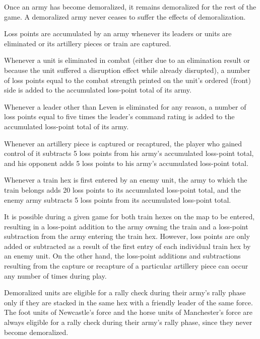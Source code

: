  Once an army has become demoralized, it remains demoralized for the rest of the game. A demoralized army never ceases to suffer the effects of demoralization.

 Loss points are accumulated by an army whenever its leaders or units are eliminated or its artillery pieces or train are captured.

\begin{tightitems}
  \item Whenever a unit is eliminated in combat (either due to an elimination result or because the unit suffered a disruption effect while already disrupted), a number of loss points equal to the combat strength printed on the unit's ordered (front) side is added to the accumulated loss-point total of its army.
  \item Whenever a leader other than Leven is eliminated for any reason, a number of loss points equal to five times the leader's command rating is added to the accumulated loss-point total of its army.
  \item Whenever an artillery piece is captured or recaptured, the player who gained control of it subtracts 5 loss points from his army's accumulated loss-point total, and his opponent adds 5 loss points to his army's accumulated loss-point total.
  \item Whenever a train hex is first entered by an enemy unit, the army to which the train belongs adds 20 loss points to its accumulated loss-point total, and the enemy army subtracts 5 loss points from its accumulated loss-point total.
\end{tightitems}

It is possible during a given game for both train hexes on the map to be entered, resulting in a loss-point addition to the army owning the train and a loss-point subtraction from the army entering the train hex. However, loss points are only added or subtracted as a result of the first entry of each individual train hex by an enemy unit. On the other hand, the loss-point additions and subtractions resulting from the capture or recapture of a particular artillery piece can occur any number of times during play.

 Demoralized units are eligible for a rally check during their army's rally phase only if they are stacked in the same hex with a friendly leader of the same force. The foot units of Newcastle's force and the horse units of Manchester's force are always eligible for a rally check during their army's rally phase, since they never become demoralized.

